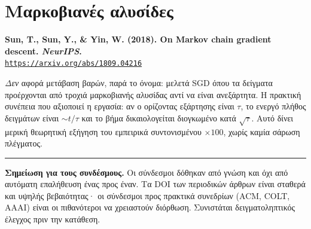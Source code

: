 \documentclass[11pt,a4paper]{article}
\newcommand{\src}[3]{%
  \par\medskip\noindent\textbf{#2}\\
  \href{#3}{\texttt{\small #3}}\par\smallskip}
\begin{document}
\section{Μαρκοβιανές αλυσίδες}

\src{sun2018}{Sun, T., Sun, Y., \& Yin, W. (2018). On Markov chain gradient descent.
\emph{NeurIPS}.}
{https://arxiv.org/abs/1809.04216}
\emph{Δεν} αφορά μετάβαση βαρών, παρά το όνομα: μελετά SGD όπου τα δείγματα προέρχονται από
τροχιά μαρκοβιανής αλυσίδας αντί να είναι ανεξάρτητα. Η πρακτική συνέπεια που αξιοποιεί η
εργασία: αν ο ορίζοντας εξάρτησης είναι $\tau$, το ενεργό πλήθος δειγμάτων είναι $\sim t/\tau$
και το βήμα δικαιολογείται διογκωμένο κατά $\sqrt{\tau}$. Αυτό δίνει μερική θεωρητική εξήγηση
του εμπειρικά συντονισμένου $\times100$, χωρίς καμία σάρωση πλέγματος.

\vspace{1.5em}
\hrule
\vspace{0.8em}
{\small
\textbf{Σημείωση για τους συνδέσμους.} Οι σύνδεσμοι δόθηκαν από γνώση και όχι από αυτόματη
επαλήθευση ένας προς έναν. Τα DOI των περιοδικών άρθρων είναι σταθερά και υψηλής
βεβαιότητας· οι σύνδεσμοι προς πρακτικά συνεδρίων (ACM, COLT, AAAI) είναι οι πιθανότεροι να
χρειαστούν διόρθωση. Συνιστάται δειγματοληπτικός έλεγχος πριν την κατάθεση.
}
\end{document}
